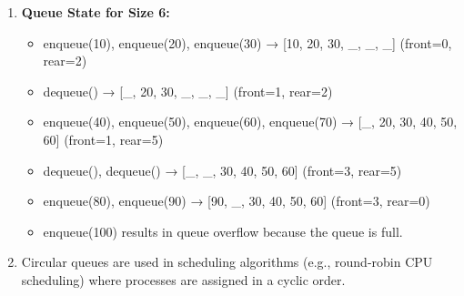 \documentclass[12pt]{article}
\begin{document}
\begin{enumerate}
    \item \textbf{Queue State for Size 6:}
    \begin{itemize}
        \item enqueue(10), enqueue(20), enqueue(30) → [10, 20, 30, _, _, _] (front=0, rear=2)
        \item dequeue() → [_, 20, 30, _, _, _] (front=1, rear=2)
        \item enqueue(40), enqueue(50), enqueue(60), enqueue(70) → [_, 20, 30, 40, 50, 60] (front=1, rear=5)
        \item dequeue(), dequeue() → [_, _, 30, 40, 50, 60] (front=3, rear=5)
        \item enqueue(80), enqueue(90) → [90, _, 30, 40, 50, 60] (front=3, rear=0)
        \item enqueue(100) results in queue overflow because the queue is full.
    \end{itemize}
    
    \item Circular queues are used in scheduling algorithms (e.g., round-robin CPU scheduling) where processes are assigned in a cyclic order.
\end{enumerate}
\end{document}
